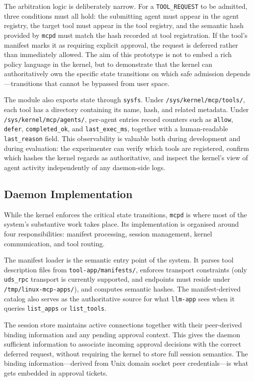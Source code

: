The arbitration logic is deliberately narrow.
For a \texttt{TOOL\_REQUEST} to be admitted, three conditions must all hold: the submitting agent must appear in the agent registry, the target tool must appear in the tool registry, and the semantic hash provided by \texttt{mcpd} must match the hash recorded at tool registration.
If the tool's manifest marks it as requiring explicit approval, the request is deferred rather than immediately allowed.
The aim of this prototype is not to embed a rich policy language in the kernel, but to demonstrate that the kernel can authoritatively own the specific state transitions on which safe admission depends---transitions that cannot be bypassed from user space.

The module also exports state through \texttt{sysfs}.
Under \texttt{/sys/kernel/mcp/tools/}, each tool has a directory containing its name, hash, and related metadata.
Under \texttt{/sys/kernel/mcp/agents/}, per-agent entries record counters such as \texttt{allow}, \texttt{defer}, \texttt{completed\_ok}, and \texttt{last\_exec\_ms}, together with a human-readable \texttt{last\_reason} field.
This observability is valuable both during development and during evaluation: the experimenter can verify which tools are registered, confirm which hashes the kernel regards as authoritative, and inspect the kernel's view of agent activity independently of any daemon-side logs.



\subsection{Daemon Implementation}

While the kernel enforces the critical state transitions, \texttt{mcpd} is where most of the system's substantive work takes place.
Its implementation is organised around four responsibilities: manifest processing, session management, kernel communication, and tool routing.

The manifest loader is the semantic entry point of the system.
It parses tool description files from \texttt{tool-app/manifests/}, enforces transport constraints (only \texttt{uds\_rpc} transport is currently supported, and endpoints must reside under \texttt{/tmp/linux-mcp-apps/}), and computes semantic hashes.
The manifest-derived catalog also serves as the authoritative source for what \texttt{llm-app} sees when it queries \texttt{list\_apps} or \texttt{list\_tools}.

The session store maintains active connections together with their peer-derived binding information and any pending approval context.
This gives the daemon sufficient information to associate incoming approval decisions with the correct deferred request, without requiring the kernel to store full session semantics.
The binding information---derived from Unix domain socket peer
credentials---is what gets embedded in approval tickets.

